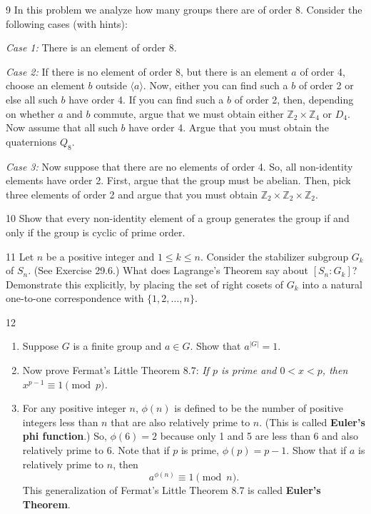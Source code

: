 \begin{problem}{9}
    In this problem we analyze how many groups there are of order 8. Consider the
    following cases (with hints):

    \emph{Case 1:} There is an element of order 8.

    \emph{Case 2:} If there is no element of order 8, but there is an element $a$ of order
    4, choose an element $b$ outside $\langle a \rangle$. Now, either you can find such a
    $b$ of order 2 or else all such $b$ have order 4. If you can find such a $b$ of order
    2, then, depending on whether $a$ and $b$ commute, argue that we must obtain either
    $\mathbb{Z}_2 \times \mathbb{Z}_4$ or $D_4$. Now assume that all such $b$ have order 4.
    Argue that you must obtain the quaternions $Q_8$.

    \emph{Case 3:} Now suppose that there are no elements of order 4. So, all non-identity
    elements have order 2. First, argue that the group must be abelian. Then, pick three
    elements of order 2 and argue that you must obtain
    $\mathbb{Z}_2 \times \mathbb{Z}_2 \times \mathbb{Z}_2$.
\end{problem}
\unsolved

\begin{problem}{10}
    Show that every non-identity element of a group generates the group if and only if the
    group is cyclic of prime order.
\end{problem}
\unsolved

\begin{problem}{11}
    Let $n$ be a positive integer and $1 \le k \le n$. Consider the stabilizer subgroup
    $G_k$ of $S_n$. (See Exercise 29.6.) What does Lagrange's Theorem say about
    $[S_n : G_k]$? Demonstrate this explicitly, by placing the set of right cosets of $G_k$
    into a natural one-to-one correspondence with $\{1, 2, \ldots, n\}$.
\end{problem}
\unsolved

\begin{problem}{12}
    \begin{enumerate}
        \item[(a)] Suppose $G$ is a finite group and $a \in G$. Show that $a^{|G|} = 1$.
        \item[(b)] Now prove Fermat's Little Theorem 8.7: \emph{If $p$ is prime and
        $0 < x < p$, then $x^{p - 1} \equiv 1 \pmod{p}$.}
        \item[(c)] For any positive integer $n$, $\phi(n)$ is defined to be the number of
        positive integers less than $n$ that are also relatively prime to $n$. (This is
        called \textbf{Euler's phi function}.) So, $\phi(6) = 2$ because only 1 and 5 are
        less than 6 and also relatively prime to 6. Note that if $p$ is prime,
        $\phi(p) = p - 1$. Show that if $a$ is relatively prime to $n$, then
        \[a^{\phi(n)} \equiv 1 \pmod{n}.\]
        This generalization of Fermat's Little Theorem 8.7 is called
        \textbf{Euler's Theorem}.
    \end{enumerate}
\end{problem}
\unsolved

